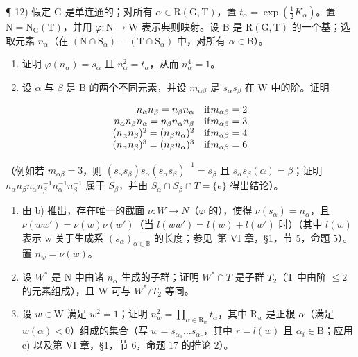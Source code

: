 ¶ 12) 假定 G 是单连通的；对所有 \(\alpha \in \mathrm{R}(\mathrm{G},\mathrm{T})\)，置 \(t_{\alpha} = \exp (\frac{1}{2} K_{\alpha})\)。置 \(\mathrm{N} = \mathrm{N}_{\mathrm{G}}(\mathrm{T})\)，并用 \(\varphi : \mathrm{N} \to \mathrm{W}\) 表示典则映射。设 B 是 \(\mathrm{R}(\mathrm{G},\mathrm{T})\) 的一个基；选取元素 \(n_{\alpha}\)（在 \((\mathrm{N} \cap \mathrm{S}_{\alpha}) - (\mathrm{T} \cap \mathrm{S}_{\alpha})\) 中，对所有 \(\alpha \in \mathrm{B}\)）。

\begin{enumerate}
\def\labelenumi{\alph{enumi})}
\item
  证明 \(\varphi(n_{\alpha}) = s_{\alpha}\) 且 \(n_{\alpha}^{2} = t_{\alpha}\)，从而 \(n_{\alpha}^{4} = 1\)。
\item
  设 \(\alpha\) 与 \(\beta\) 是 B 的两个不同元素，并设 \(m_{\alpha \beta}\) 是 \(s_{\alpha}s_{\beta}\) 在 W 中的阶。证明
\end{enumerate}

\[
\begin{array}{r l} {n _ {\alpha} n _ {\beta} = n _ {\beta} n _ {\alpha}} & {\mathrm{if} m _ {\alpha \beta} = 2} \\ {n _ {\alpha} n _ {\beta} n _ {\alpha} = n _ {\beta} n _ {\alpha} n _ {\beta}} & {\mathrm{if} m _ {\alpha \beta} = 3} \\ {(n _ {\alpha} n _ {\beta}) ^ {2} = (n _ {\beta} n _ {\alpha}) ^ {2}} & {\mathrm{if} m _ {\alpha \beta} = 4} \\ {(n _ {\alpha} n _ {\beta}) ^ {3} = (n _ {\beta} n _ {\alpha}) ^ {3}} & {\mathrm{if} m _ {\alpha \beta} = 6} \end{array}
\]

（例如若 \(m_{\alpha\beta}=3\)，则 \((s_{\alpha}s_{\beta})s_{\alpha}(s_{\alpha}s_{\beta})^{-1}=s_{\beta}\) 且 \(s_{\alpha}s_{\beta}(\alpha)=\beta\)；证明 \(n_{\alpha}n_{\beta}n_{\alpha}n_{\beta}^{-1}n_{\alpha}^{-1}n_{\beta}^{-1}\) 属于 \(S_{\beta}\)，并由 \(S_{\alpha}\cap S_{\beta}\cap T=\{e\}\) 得出结论）。

\begin{enumerate}
\def\labelenumi{\alph{enumi})}
\setcounter{enumi}{2}
\item
  由 b) 推出，存在唯一的截面 \(\nu: W \to N\)（\(\varphi\) 的），使得 \(\nu(s_{\alpha}) = n_{\alpha}\)，且 \(\nu(ww') = \nu(w)\nu(w')\)（当 \(l(ww') = l(w) + l(w')\) 时）（其中 \(l(w)\) 表示 w 关于生成系 \((s_{\alpha})_{\alpha \in \mathbb{B}}\) 的长度；参见~第 VI 章，§1，节 5，命题 5）。置 \(n_w = \nu(w)\)。
\item
  设 \(W^{*}\) 是 N 中由诸 \(n_{\alpha}\) 生成的子群；证明 \(W^{*} \cap T\) 是子群 \(T_{2}\)（T 中由阶 \(\leq 2\) 的元素组成），且 W 可与 \(W^{*}/T_{2}\) 等同。
\item
  设 \(w \in \mathrm{W}\) 满足 \(w^2 = 1\)；证明 \(n_w^2 = \prod_{\alpha \in \mathrm{R}_w} t_\alpha\)，其中 \(\mathrm{R}_w\) 是正根 \(\alpha\)（满足 \(w(\alpha) < 0\)）组成的集合（写 \(w = s_{\alpha_1} \ldots s_{\alpha_r}\)，其中 \(r = l(w)\) 且 \(\alpha_i \in \mathrm{B}\)；应用 c) 以及第 VI 章，§1，节 6，命题 17 的推论 2）。
\end{enumerate}

